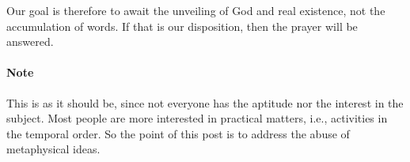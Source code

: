 Our goal is therefore to await the unveiling of God and real existence, not the accumulation of words. If that is our disposition, then the prayer will be answered.

\paragraph{Note}

This is as it should be, since not everyone has the aptitude nor the interest in the subject. Most people are more interested in practical matters, i.e., activities in the temporal order. So the point of this post is to address the abuse of metaphysical ideas.


